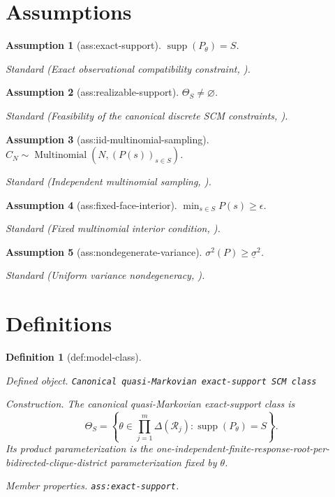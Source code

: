 \documentclass{article}
\newtheorem{assumption}{Assumption}
\newtheorem{definition}{Definition}
\begin{document}
\section{Assumptions}

\begin{assumption}[ass:exact-support]\label{ass:exact-support}
\(\operatorname{supp}(P_{\theta})=S\).
\par\smallskip\noindent\emph{Standard} (Exact observational compatibility constraint, \cite{ChenDarwiche2024Constrained}).
\end{assumption}

\begin{assumption}[ass:realizable-support]\label{ass:realizable-support}
\(\Theta_S\ne\varnothing\).
\par\smallskip\noindent\emph{Standard} (Feasibility of the canonical discrete SCM constraints, \cite{DuarteFinkelsteinKnoxMummoloShpitser2023}).
\end{assumption}

\begin{assumption}[ass:iid-multinomial-sampling]\label{ass:iid-multinomial-sampling}
\(C_N\sim\operatorname{Multinomial}(N,(P(s))_{s\in S})\).
\par\smallskip\noindent\emph{Standard} (Independent multinomial sampling, \cite{vanDerVaart1998}).
\end{assumption}

\begin{assumption}[ass:fixed-face-interior]\label{ass:fixed-face-interior}
\(\min_{s\in S}P(s)\ge\epsilon\).
\par\smallskip\noindent\emph{Standard} (Fixed multinomial interior condition, \cite{vanDerVaart1998}).
\end{assumption}

\begin{assumption}[ass:nondegenerate-variance]\label{ass:nondegenerate-variance}
\(\sigma^2(P)\ge\underline\sigma^2\).
\par\smallskip\noindent\emph{Standard} (Uniform variance nondegeneracy, \cite{vanDerVaart1998}).
\end{assumption}

\section{Definitions}

\begin{definition}[def:model-class]\label{def:model-class}
\par\smallskip\noindent\emph{Defined object.} \texttt{Canonical quasi-\allowbreak{}Markovian exact-\allowbreak{}support SCM class}
\par\smallskip\noindent\emph{Construction.} The canonical quasi-Markovian exact-support class is
\[
\Theta_S=\left\{\theta\in\prod_{j=1}^m\Delta(\mathcal R_j):
\operatorname{supp}(P_\theta)=S\right\}.
\]
Its product parameterization is the one-independent-finite-response-root-per-bidirected-clique-district parameterization fixed by \(\theta\).
\par\smallskip\noindent\emph{Member properties.} \texttt{ass:\allowbreak{}exact-\allowbreak{}support}.
\end{definition}
\end{document}
